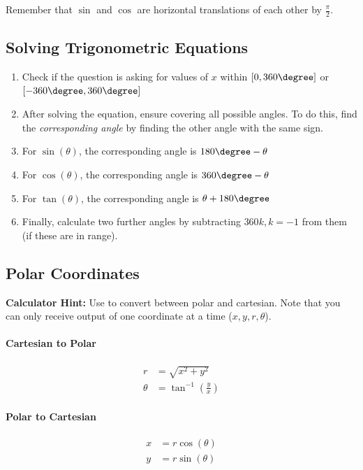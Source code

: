 Remember that \( \sin \) and \( \cos \) are horizontal translations of each other by \(\frac{\pi}{2}\).

\subsection{Solving Trigonometric Equations}

\begin{enumerate}
	\item Check if the question is asking for values of \(x\) within \([0,360\degree]\) or \([-360\degree,360\degree]\)
	\item After solving the equation, ensure covering all possible angles. To do this, find the \emph{corresponding angle} by finding the other angle with the same sign.
	\item For \(\sin(\theta)\), the corresponding angle is \(180\degree - \theta \)
	\item For \(\cos(\theta)\), the corresponding angle is \(360\degree - \theta \)
	\item For \(\tan(\theta)\), the corresponding angle is \(\theta + 180\degree \)
	\item Finally, calculate two further angles by subtracting \( 360k, k = -1 \) from them (if these are in range).
\end{enumerate}

\subsection{Polar Coordinates}

\begin{mdframed}
\textbf{Calculator Hint:} Use   to convert between polar and cartesian. Note that you can only receive output of one coordinate at a time (\(x,y,r,\theta \)).
\end{mdframed}

\paragraph{Cartesian to Polar}
\begin{align}
	r      & = \sqrt{x^2+y^2}         \\
	\theta & = \tan^{-1}(\frac{y}{x})
\end{align}

\paragraph{Polar to Cartesian}
\begin{align}
	x & = r \cos(\theta) \\
	y & = r \sin(\theta)
\end{align}

